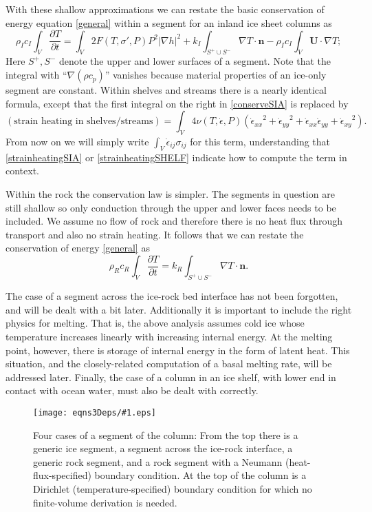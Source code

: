 \documentclass[12pt,final]{amsart}%
\theoremstyle{plain}
\theoremstyle{definition}
\theoremstyle{remark}
\newcommand{\regfigure}[2]{\texttt{[image: eqns3Deps/\#1.eps]}}
\newcommand{\ddt}[1]{\ensuremath{\frac{\partial #1}{\partial t}}}
\def\eps{\epsilon}
\newcommand{\grad}{\nabla}
\newcommand{\nhat}{\mathbf{n}}
\newcommand{\bU}{{\mathbf{U}}}
\begin{document}
With these shallow approximations we can restate the basic conservation of energy equation \eqref{general} within a segment for an inland ice sheet columns as
\begin{equation}\label{conserveSIA}
\rho_I c_I \int_V \ddt{T} = \int_V 2 F(T,\sigma',P) P^2 |\grad h|^2 + k_I \int_{S^+ \cup S^-} \grad T \cdot \nhat - \rho_I c_I \int_V \bU \cdot \grad T;
\end{equation}
Here $S^+,S^-$ denote the upper and lower surfaces of a segment.  Note that the integral with ``$\grad(\rho c_p)$'' vanishes because material properties of an ice-only segment are constant.  Within shelves and streams there is a nearly identical formula, except that the first integral on the right in \eqref{conserveSIA} is replaced by
\begin{equation*}
(\text{strain heating in shelves/streams}) =  \int_V 4 \nu(T,\dot\eps,P) \left({\dot\eps_{xx}}^2 + {\dot\eps_{yy}}^2 + \dot\eps_{xx} \dot\eps_{yy} + {\dot\eps_{xy}}^2\right).
\end{equation*}
From now on we will simply write $\int_V \dot \eps_{ij} \sigma_{ij}$ for this term, understanding that \eqref{strainheatingSIA} or \eqref{strainheatingSHELF} indicate how to compute the term in context.

Within the rock the conservation law is simpler.  The segments in question are still shallow so only conduction through the upper and lower faces needs to be included.  We assume no flow of rock and therefore there is no heat flux through transport and also no strain heating.  It follows that we can restate the conservation of energy \eqref{general} as
\begin{equation}\label{conserveROCK}
\rho_R c_R \int_V \ddt{T} = k_R \int_{S^+ \cup S^-} \grad T \cdot \nhat.
\end{equation}

The case of a segment across the ice-rock bed interface has not been forgotten, and will be dealt with a bit later.  Additionally it is important to include the right physics for melting.  That is, the above analysis assumes cold ice whose temperature increases linearly with increasing internal energy.  At the melting point, however, there is storage of internal energy in the form of latent heat.  This situation, and the closely-related computation of a basal melting rate, will be addressed later.  Finally, the case of a column in an ice shelf, with lower end in contact with ocean water, must also be dealt with correctly.

\begin{figure}[ht]
\vspace{0.2in}
\regfigure{fourcases}{4.0}
\vspace{0.1in}
\caption{Four cases of a segment of the column: From the top there is a generic ice segment, a segment across the ice-rock interface, a generic rock segment, and a rock segment with a Neumann (heat-flux-specified) boundary condition.  At the top of the column is a Dirichlet (temperature-specified) boundary condition for which no finite-volume derivation is needed.}
\label{fig:segments}
\end{figure}
\end{document}

